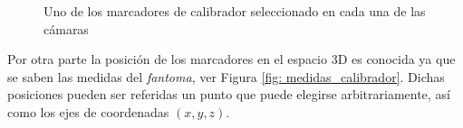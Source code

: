 \begin{figure}[ht!]
      
      \caption{Uno de los marcadores de calibrador seleccionado en cada una de las cámaras}
      \label{fig: vistas_calibrador}      
\end{figure}


Por otra parte la posición de los marcadores en el espacio 3D es conocida ya que se saben las medidas del \textit{fantoma}, ver Figura \ref{fig: medidas_calibrador}. Dichas posiciones pueden ser referidas un punto que puede elegirse arbitrariamente, así como los ejes de coordenadas $(x,y,z)$.

